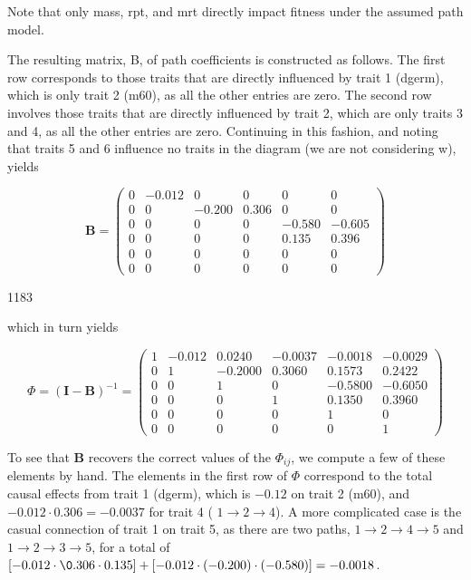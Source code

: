 \documentclass{article}
\begin{document}
Note that only mass, rpt, and mrt directly impact fitness under the assumed path model.

The resulting matrix, B, of path coefficients is constructed as follows. The first row corresponds to those traits that are directly influenced by trait 1 (dgerm), which is only trait 2 (m60), as all the other entries are zero. The second row involves those traits that are directly influenced by trait 2, which are only traits 3 and 4, as all the other entries are zero. Continuing in this fashion, and noting that traits 5 and 6 influence no traits in the diagram (we are not considering w), yields

\begin{equation}
\mathbf{B}=\begin{pmatrix}{{{0}}}&{{{-0.012}}}&{{{0}}}&{{{0}}}&{{{0}}}&{{{0}}} \\{{{0}}}&{{{0}}}&{{{-0.200}}}&{{{0.306}}}&{{{0}}}&{{{0}}} \\{{{0}}}&{{{0}}}&{{{0}}}&{{{0}}}&{{{-0.580}}}&{{{-0.605}}} \\{{{0}}}&{{{0}}}&{{{0}}}&{{{0}}}&{{{0.135}}}&{{{0.396}}} \\{{{0}}}&{{{0}}}&{{{0}}}&{{{0}}}&{{{0}}}&{{{0}}} \\{{{0}}}&{{{0}}}&{{{0}}}&{{{0}}}&{{{0}}}&{{{0}}}\end{pmatrix}
\end{equation}

1183

which in turn yields

\begin{equation}
\boldsymbol{\varPhi}=(\mathbf{I}-\mathbf{B})^{-1}=\begin{pmatrix}{{{1}}}&{{{-0.012}}}&{{{0.0240}}}&{{{-0.0037}}}&{{{-0.0018}}}&{{{-0.0029}}} \\{{{0}}}&{{{1}}}&{{{-0.2000}}}&{{{0.3060}}}&{{{0.1573}}}&{{{0.2422}}} \\{{{0}}}&{{{0}}}&{{{1}}}&{{{0}}}&{{{-0.5800}}}&{{{-0.6050}}} \\{{{0}}}&{{{0}}}&{{{0}}}&{{{1}}}&{{{0.1350}}}&{{{0.3960}}} \\{{{0}}}&{{{0}}}&{{{0}}}&{{{0}}}&{{{1}}}&{{{0}}} \\{{{0}}}&{{{0}}}&{{{0}}}&{{{0}}}&{{{0}}}&{{{1}}}\end{pmatrix}
\end{equation}

To see that  $ \mathbf{B} $ recovers the correct values of the  $ \Phi_{ij} $, we compute a few of these elements by hand. The elements in the first row of  $ \Phi $ correspond to the total causal effects from trait 1 (dgerm), which is  $ -0.12 $ on trait 2 (m60), and  $ -0.012 \cdot 0.306 = -0.0037 $ for trait 4 ( $ 1 \rightarrow 2 \rightarrow 4 $). A more complicated case is the casual connection of trait 1 on trait 5, as there are two paths,  $ 1 \rightarrow 2 \rightarrow 4 \rightarrow 5 $ and  $ 1 \rightarrow 2 \rightarrow 3 \rightarrow 5 $, for a total of  $ [-0.012 \cdot \0.306 \cdot 0.135] + [-0.012 \cdot (-0.200) \cdot (-0.580)] = -0.0018 $.
\end{document}
